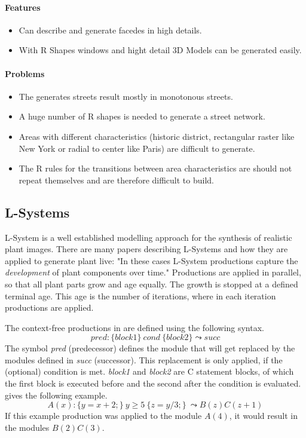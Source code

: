 \documentclass[11pt, a4paper]{report}
\begin{document}
\paragraph{Features}
    \begin{itemize}
        \item Can describe and generate facedes in high details.
        \item With R Shapes windows and hight detail 3D Models can be generated easily.
    \end{itemize}

\paragraph{Problems}
    \begin{itemize}
        \item The generates streets result mostly in monotonous streets. 
        \item A huge number of R shapes is needed to generate a street network.
        \item Areas with different characteristics (historic district, rectangular raster like New York or radial to center like Paris) are difficult to generate.
        \item The R rules for the transitions between area characteristics are should not repeat themselves and are therefore difficult to build.
    \end{itemize}

\pagebreak
\subsection{L-Systems}
L-System is a well established modelling approach for the synthesis of realistic plant images. There are many papers describing L-Systems and how they are applied to generate plant live: "In these cases L-System productions capture the \textit{development} of plant components over time." \citep{PrusinkiewiczEtAl:2001} Productions are applied in parallel, so that all plant parts grow and age equally. The growth is stopped at a defined terminal age. This age is the number of iterations, where in each iteration productions are applied.

The context-free productions in \citep{PrusinkiewiczEtAl:2001} are defined using the following syntax.
\begin{equation} \label{eq:lsystem context free}
    pred : \{block1\}\ cond\ \{block2\} \leadsto succ
\end{equation}
The symbol \textit{pred} (predecessor) defines the module that will get replaced by the modules defined in \textit{succ} (successor). This replacement is only applied, if the (optional) condition is met. \textit{block1} and \textit{block2} are C statement blocks, of which the first block is executed before and the second after the condition is evaluated. \citep{PrusinkiewiczEtAl:2001} gives the following example.
\begin{equation} \label{eq:lsystem example 1}
    A(x) : \{y = x + 2;\}\ y \geq 5\ \{z = y / 3;\}\ \leadsto B(z)C(z + 1)
\end{equation}
If this example production was applied to the module $A(4)$, it would result in the modules $B(2)C(3)$.
\end{document}
